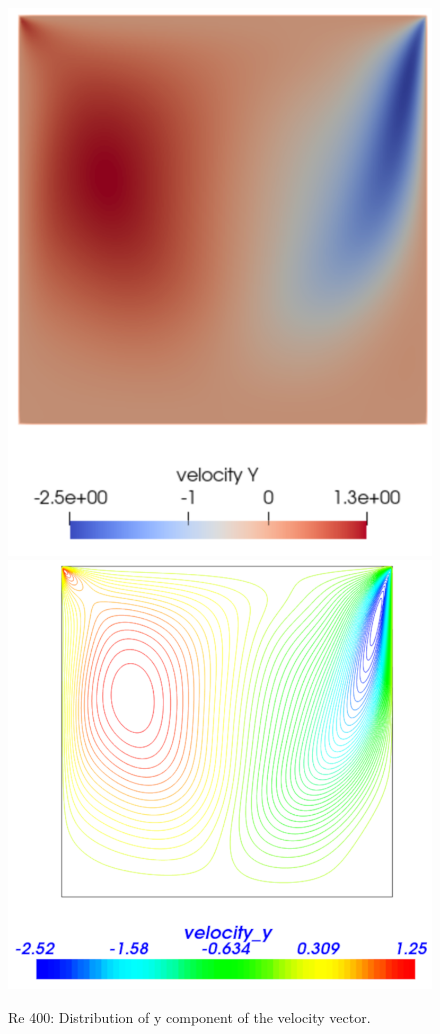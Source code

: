 \begin{figure}[H]
\centering
\includegraphics[scale=0.28]{DC_velocity_y}
\includegraphics[scale=0.35]{DC_velocity_y_VTK}
\caption{Re 400: Distribution of y component of the velocity vector.}\label{fg:DC_velocity_y}
\end{figure} 

